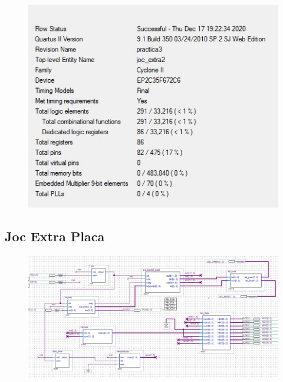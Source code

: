 \documentclass[12pt, a4papre]{article}
\begin{document}
	
	\begin{figure}[H]
	
				\begin{center}
		\includegraphics[width=130mm]{informeJocExtra.jpeg}
		\end{center}
	\end{figure}
	

\subsection{Joc Extra Placa}

	\begin{figure}[H]
	
				\begin{center}
		\includegraphics[width=130mm]{JocExtraPlaca.jpeg}
		\end{center}
	\end{figure}





	
	
\end{document}
